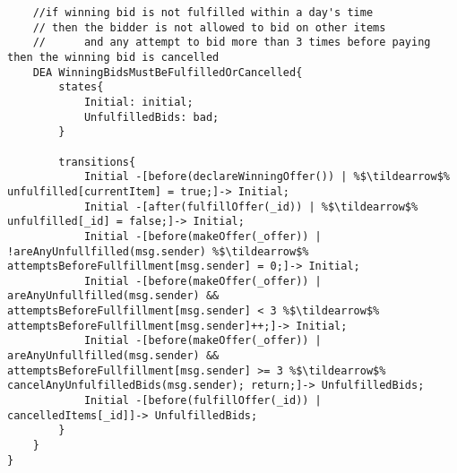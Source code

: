 \documentclass{article}
\newcommand{\tildearrow}{{\raise.37ex\hbox{$\scriptstyle\mathtt{\sim}$}}\hspace{-0.08cm}>\xspace}
\begin{document}
\begin{lstlisting}
    //if winning bid is not fulfilled within a day's time
    // then the bidder is not allowed to bid on other items
    //      and any attempt to bid more than 3 times before paying then the winning bid is cancelled 
    DEA WinningBidsMustBeFulfilledOrCancelled{
        states{
            Initial: initial;
            UnfulfilledBids: bad;
        }

        transitions{
            Initial -[before(declareWinningOffer()) | %$\tildearrow$% unfulfilled[currentItem] = true;]-> Initial;
            Initial -[after(fulfillOffer(_id)) | %$\tildearrow$% unfulfilled[_id] = false;]-> Initial;
            Initial -[before(makeOffer(_offer)) | !areAnyUnfullfilled(msg.sender) %$\tildearrow$% attemptsBeforeFullfillment[msg.sender] = 0;]-> Initial;
            Initial -[before(makeOffer(_offer)) | areAnyUnfullfilled(msg.sender) && attemptsBeforeFullfillment[msg.sender] < 3 %$\tildearrow$% attemptsBeforeFullfillment[msg.sender]++;]-> Initial;
            Initial -[before(makeOffer(_offer)) | areAnyUnfullfilled(msg.sender) && attemptsBeforeFullfillment[msg.sender] >= 3 %$\tildearrow$% cancelAnyUnfulfilledBids(msg.sender); return;]-> UnfulfilledBids;
            Initial -[before(fulfillOffer(_id)) | cancelledItems[_id]]-> UnfulfilledBids;
        }
    }
}
\end{lstlisting}\normalsize
\end{document}
